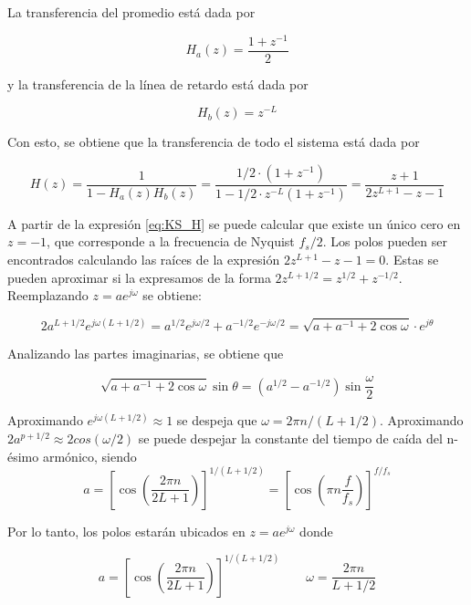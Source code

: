 La transferencia del promedio está dada por

\begin{equation}
    H_a(z) = \frac{1+z^{-1}}{2}
\end{equation}

y la transferencia de la línea de retardo está dada por

\begin{equation}
    H_b(z) = z^{-L}
\end{equation}

Con esto, se obtiene que la transferencia de todo el sistema está dada por

\begin{equation}
    H(z) = \frac{1}{1- H_a(z) H_b(z)} = \frac{1/2\cdot (1+z^{-1})}{1-1/2\cdot z^{-L}(1+z^{-1})}= \frac{z+1}{2z^{L+1}-z-1}
    \label{eq:KS_H}
\end{equation}

A partir de la expresión \eqref{eq:KS_H} se puede calcular que existe un único cero en $z=-1$, que corresponde a la frecuencia de Nyquist $f_s/2$. Los polos pueden ser encontrados calculando las raíces de la expresión $2z^{L+1}-z-1 = 0$. Estas se pueden aproximar si la expresamos de la forma $2z^{L+1/2} = z^{1/2} + z^{-1/2}$. Reemplazando $z=a e^{j\omega}$ se obtiene:

\begin{equation}
    2 a^{L+1/2} e^{j\omega(L+1/2)} = a^{1/2}e^{j\omega/2} + a^{-1/2}e^{-j\omega/2}=\sqrt{a + a^{-1} + 2 \cos\omega } \cdot e^{j\theta}
\end{equation}

Analizando las partes imaginarias, se obtiene que

\begin{equation*}
    \sqrt{a + a^{-1} + 2 \cos\omega } \sin\theta = (a^{1/2} - a^{-1/2}) \sin\frac{\omega}{2}
\end{equation*}

Aproximando $e^{j\omega(L+1/2)} \approx 1$ se despeja que $\omega = 2 \pi n / (L+1/2)$. Aproximando $2 a^{p+1/2}\approx 2 cos(\omega/2)$ se puede despejar la constante del tiempo de caída del n-ésimo armónico, siendo
\begin{equation}
    a=\left[\cos\left( \frac{2 \pi n}{2L+1}\right)\right]^{1/(L+1/2)} = \left[\cos\left( \pi n \frac{f}{f_s}\right) \right]^{f/f_s}
\end{equation}

Por lo tanto, los polos estarán ubicados en $z = a e^{j\omega}$ donde

\begin{equation*}
    a = \left[\cos\left( \frac{2 \pi n}{2L+1}\right)\right]^{1/(L+1/2)} \qquad \omega = \frac{2 \pi n}{L+1/2}
\end{equation*}

